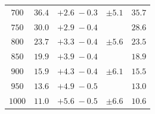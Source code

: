 \begin{table}[h!]
\begin{tabular}{ccccc}
$700 $&$  36.4 $&$ +2.6 \; -\!0.3 $&$ \pm 5.1  $&$ 35.7 $ \\
$750 $&$  30.0 $&$ +2.9 \; -\!0.4 $&$          $&$ 28.6 $ \\
$800 $&$  23.7 $&$ +3.3 \; -\!0.4 $&$ \pm 5.6  $&$ 23.5 $ \\
$850 $&$  19.9 $&$ +3.9 \; -\!0.4 $&$          $&$ 18.9 $ \\
$900 $&$  15.9 $&$ +4.3 \; -\!0.4 $&$ \pm 6.1  $&$ 15.5 $ \\
$950 $&$  13.6 $&$ +4.9 \; -\!0.5 $&$          $&$ 13.0 $ \\
$1000$&$  11.0 $&$ +5.6 \; -\!0.5 $&$ \pm 6.6  $&$ 10.6 $ \\
\hline
\end{tabular}   
\label{tab:yesEWnoSch7TeV}
\end{table}



